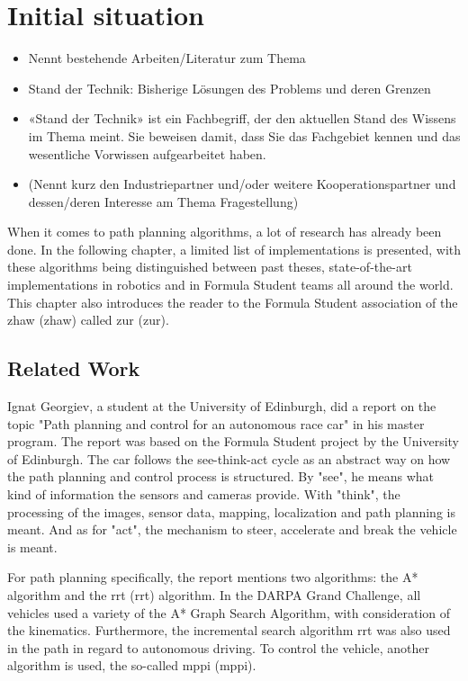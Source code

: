 \section{Initial situation}

\begin{itemize}
    \item Nennt bestehende Arbeiten/Literatur zum Thema
    \item Stand der Technik: Bisherige Lösungen des Problems und deren Grenzen
    \item «Stand der Technik» ist ein Fachbegriff, der den aktuellen Stand des Wissens im Thema meint. Sie beweisen damit, dass Sie das Fachgebiet kennen und das wesentliche Vorwissen aufgearbeitet haben.
    \item (Nennt kurz den Industriepartner und/oder weitere Kooperationspartner und dessen/deren Interesse am Thema Fragestellung)
\end{itemize}

When it comes to path planning algorithms, a lot of research has already been done. In the following chapter, a limited list of implementations is presented, with these algorithms being distinguished between past theses, state-of-the-art implementations in robotics and in Formula Student teams all around the world. This chapter also introduces the reader to the Formula Student association of the \acrlong{zhaw} (\acrshort{zhaw}) called \acrlong{zur} (\acrshort{zur}).

\subsection{Related Work}

Ignat Georgiev, a student at the University of Edinburgh, did a report on the topic "Path planning and control for an autonomous race car" in his master program. The report was based on the Formula Student project by the University of Edinburgh. The car follows the see-think-act cycle as an abstract way on how the path planning and control process is structured. By "see", he means what kind of information the sensors and cameras provide. With "think", the processing of the images, sensor data, mapping, localization and path planning is meant. And as for "act", the mechanism to steer, accelerate and break the vehicle is meant.

For path planning specifically, the report mentions two algorithms: the A* algorithm and the \acrlong{rrt} (\acrshort{rrt}) algorithm. In the DARPA Grand Challenge, all vehicles used a variety of the A* Graph Search Algorithm, with consideration of the kinematics. Furthermore, the incremental search algorithm \acrshort{rrt} was also used in the path in regard to autonomous driving.
To control the vehicle, another algorithm is used, the so-called \acrlong{mppi} (\acrshort{mppi}).
\cite{path_planning_and_control_georgiev}

